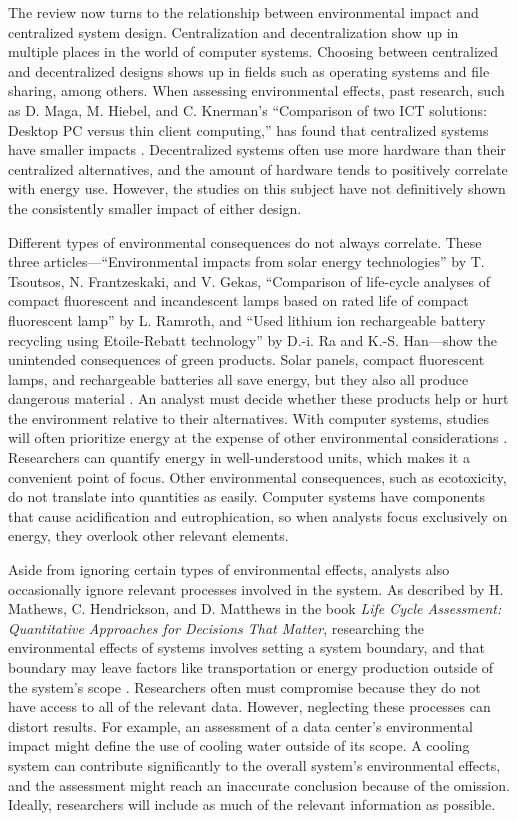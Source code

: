 \documentclass[final,journal,10pt,letterpaper,oneside,twocolumn,compsoc]%
{IEEEtran}
\begin{document}
The review now turns to the relationship between environmental impact and
centralized system design.
Centralization and decentralization show up in multiple places in the world of
computer systems. Choosing between centralized and decentralized designs shows
up in fields such as operating systems and file sharing, among others. When
assessing
environmental effects, past research, such as D. Maga, M. Hiebel, and C.
Knerman's ``Comparison of two ICT solutions: Desktop PC versus thin client
computing,'' has found that centralized systems have smaller impacts
\cite{maga}. Decentralized systems often use more hardware than their
centralized alternatives, and the amount of hardware tends to positively
correlate with energy use. However, the studies on this subject have not
definitively shown the consistently smaller impact of either design.

Different types of environmental consequences do not always correlate. These
three articles---``Environmental impacts from solar energy
technologies'' by T. Tsoutsos, N. Frantzeskaki, and V. Gekas,
``Comparison of life-cycle analyses
of compact fluorescent and incandescent lamps based on rated life of compact
fluorescent lamp'' by L. Ramroth, and ``Used lithium
ion rechargeable battery recycling using Etoile-Rebatt technology'' by D.-i. Ra
and K.-S. Han---show the unintended consequences of green products. Solar
panels, compact fluorescent lamps, and rechargeable batteries all save energy,
but they also all produce dangerous material \cite{solar} \cite{cfl}
\cite{battery}. An analyst must decide whether these products help or hurt the
environment relative to their alternatives. With computer systems, studies
will
often prioritize energy at
the expense of other environmental considerations \cite{maga}. Researchers can
quantify energy in well-understood units, which makes it a convenient point of
focus. Other environmental consequences, such
as ecotoxicity, do not translate into quantities as easily. Computer systems
have components that cause acidification and eutrophication,
so when analysts focus exclusively on energy, they overlook other relevant
elements.

Aside from ignoring certain types of environmental effects, analysts also
occasionally ignore relevant processes involved in the system. As described by
H. Mathews, C. Hendrickson, and D. Matthews in the book \textit{Life Cycle
Assessment: Quantitative Approaches for Decisions That Matter}, researching the
environmental effects of systems involves setting a system boundary, and that
boundary may leave factors like transportation or energy production outside of
the system's scope \cite{textbook}. Researchers often must compromise because
they do not have access to all of the relevant data. However, neglecting
these processes can distort results. For example, an assessment of a data
center's environmental impact
might define the use of cooling water outside of its scope. A cooling system can
contribute significantly to the overall system's environmental effects, and the
assessment might reach an inaccurate conclusion because of the omission.
Ideally, researchers will include as much of the relevant information as
possible.
\end{document}
